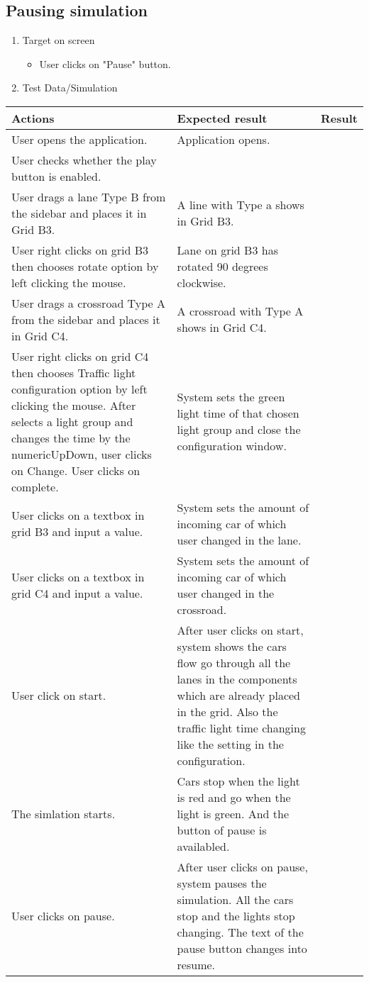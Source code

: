 \newpage

\subsection{Pausing  simulation}

\begin{enumerate}

	\item Target on screen
	\begin{itemize}
		\item User clicks on "Pause" button.
	\end{itemize}
	\item Test Data/Simulation
\end{enumerate}
	\begin{tabularx}{\textwidth}{|X|X|p{2.5cm}|}\hline
		Actions & Expected result & Result \\\hline
		User opens the application.& Application opens. &  \pass \\\hline
		User checks whether the play button is enabled. & &  \pass \\\hline
		User drags a lane Type B from the sidebar and places it in Grid B3. & A line with Type a shows in Grid B3. & \pass \\\hline
		User right clicks on grid B3 then chooses rotate option by left clicking the mouse. & Lane on grid B3 has rotated 90 degrees clockwise. & \pass \\\hline
		User drags a crossroad Type A from the sidebar and places it in Grid C4. & A crossroad with Type A shows in Grid C4. & \pass \\\hline
		User right clicks on grid C4 then chooses Traffic light configuration  option by left clicking the mouse. After selects a light group and changes the time by the numericUpDown, user clicks on Change. User clicks on complete. & System sets the green light time of that chosen light group and close the configuration window.  & \pass \\\hline
		User clicks on a textbox in grid B3 and input a value. & System sets the amount of incoming car of which user changed in the lane. & \pass \\\hline
		User clicks on a textbox in grid C4 and input a value. & System sets the amount of incoming car of which user changed in the crossroad. & \pass \\\hline
		User click on start. & After user clicks on start, system shows the cars flow go through all the lanes in the components which are already placed in the grid. Also the traffic light time changing like the setting in the configuration. & \pass \\\hline
		The simlation starts. &	Cars stop when the light is red and go when the light is green. And the button of pause is availabled. & \pass \\\hline	
		User clicks on pause. & After user clicks on pause, system pauses the simulation. All the cars stop and the lights stop changing. The text of the pause button changes into resume. & \pass \\\hline
	\end{tabularx}

